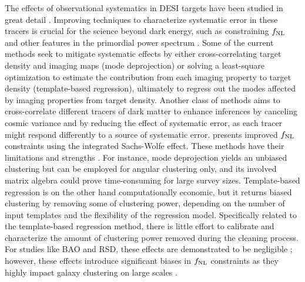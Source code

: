 The effects of observational systematics in DESI targets have been studied in great detail \cite[see, e.g.,][]{kitanidis2020imaging, zhou2021clustering, chaussidon2022angular}. Improving techniques to characterize systematic error in these tracers is crucial for the science beyond dark energy, such as constraining $f_{\rm NL}$ and other features in the primordial power spectrum \citep{beutler2019primordial}. Some of the current methods seek to mitigate systematic effects by either cross-correlating target density and imaging maps (mode deprojection) or solving a least-square optimization to estimate the contribution from each imaging property to target density (template-based regression), ultimately to regress out the modes affected by imaging properties from target density. Another class of methods aims to cross-correlate different tracers of dark matter to enhance inferences by canceling cosmic variance and by reducing the effect of systematic error, as each tracer might respond differently to a source of systematic error. \cite{giannantonio2014improved} presents improved $f_{\rm NL}$ constraints using the integrated Sachs-Wolfe effect. These methods have their limitations and strengths \citep[see, e.g.,][for a review]{2021MNRAS.503.5061W}. For instance, mode deprojection yields an unbiased clustering but can be employed for angular clustering only, and its involved matrix algebra could prove time-consuming for large survey sizes. Template-based regression is on the other hand computationally economic, but it returns biased clustering by removing some of clustering power, depending on the number of input templates and the flexibility of the regression model. Specifically related to the template-based regression method, there is little effort to calibrate and characterize the amount of clustering power removed during the cleaning process. For studies like BAO and RSD, these effects are demonstrated to be negligible \citep{merz2021clustering}; however, these effects introduce significant biases in $f_{\rm NL}$ constraints \citep{mueller2022primordial} as they highly impact galaxy clustering on large scales \citep{rezaie2021primordial}.  
 
